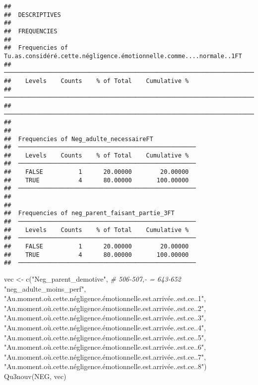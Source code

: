 \documentclass[
]{article}
\newenvironment{Shaded}{\begin{snugshade}}{\end{snugshade}}
\newcommand{\CommentTok}[1]{\textcolor[rgb]{0.56,0.35,0.01}{\textit{#1}}}
\newcommand{\FunctionTok}[1]{\textcolor[rgb]{0.00,0.00,0.00}{#1}}
\newcommand{\NormalTok}[1]{#1}
\newcommand{\OtherTok}[1]{\textcolor[rgb]{0.56,0.35,0.01}{#1}}
\newcommand{\StringTok}[1]{\textcolor[rgb]{0.31,0.60,0.02}{#1}}
\begin{document}
\begin{verbatim}
## 
##  DESCRIPTIVES
## 
##  FREQUENCIES
## 
##  Frequencies of Tu.as.considéré.cette.négligence.émotionnelle.comme....normale..1FT 
##  ────────────────────────────────────────────────────────────────────────────────── 
##    Levels    Counts    % of Total    Cumulative %   
##  ────────────────────────────────────────────────────────────────────────────────── 
##  ────────────────────────────────────────────────────────────────────────────────── 
## 
## 
##  Frequencies of Neg_adulte_necessaireFT             
##  ────────────────────────────────────────────────── 
##    Levels    Counts    % of Total    Cumulative %   
##  ────────────────────────────────────────────────── 
##    FALSE          1      20.00000        20.00000   
##    TRUE           4      80.00000       100.00000   
##  ────────────────────────────────────────────────── 
## 
## 
##  Frequencies of neg_parent_faisant_partie_3FT       
##  ────────────────────────────────────────────────── 
##    Levels    Counts    % of Total    Cumulative %   
##  ────────────────────────────────────────────────── 
##    FALSE          1      20.00000        20.00000   
##    TRUE           4      80.00000       100.00000   
##  ──────────────────────────────────────────────────
\end{verbatim}

\begin{Shaded}
\begin{Highlighting}[]
\NormalTok{vec }\OtherTok{\textless{}{-}} \FunctionTok{c}\NormalTok{(}\StringTok{"Neg\_parent\_demotive"}\NormalTok{,                 }\CommentTok{\# 506{-}507,{-} = 643{-}652}
         \StringTok{"neg\_adulte\_moins\_perf"}\NormalTok{,}
         \StringTok{"Au.moment.où.cette.négligence.émotionnelle.est.arrivée..est.ce..1"}\NormalTok{,}
         \StringTok{"Au.moment.où.cette.négligence.émotionnelle.est.arrivée..est.ce..2"}\NormalTok{,}
         \StringTok{"Au.moment.où.cette.négligence.émotionnelle.est.arrivée..est.ce..3"}\NormalTok{,}
         \StringTok{"Au.moment.où.cette.négligence.émotionnelle.est.arrivée..est.ce..4"}\NormalTok{,}
         \StringTok{"Au.moment.où.cette.négligence.émotionnelle.est.arrivée..est.ce..5"}\NormalTok{,}
         \StringTok{"Au.moment.où.cette.négligence.émotionnelle.est.arrivée..est.ce..6"}\NormalTok{,}
         \StringTok{"Au.moment.où.cette.négligence.émotionnelle.est.arrivée..est.ce..7"}\NormalTok{,}
         \StringTok{"Au.moment.où.cette.négligence.émotionnelle.est.arrivée..est.ce..8"}\NormalTok{)}
\FunctionTok{Qu3nouv}\NormalTok{(NEG, vec)}
\end{Highlighting}
\end{Shaded}
\end{document}
